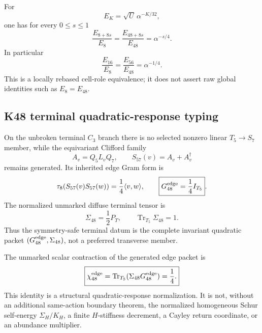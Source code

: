 \documentclass[12pt,a4paper]{article}
\begin{document}
\begin{corollary}
\label{p3c:cor:v190-normalized-energy-homology}
For
\[
 E_K=\sqrt U\,\alpha^{-K/32},
\]
one has for every $0\le s\le1$
\[
 \boxed{
 \frac{E_{8+8s}}{E_8}
 =\frac{E_{48+8s}}{E_{48}}
 =\alpha^{-s/4}.}
\]
In particular
\[
 \frac{E_{16}}{E_8}=\frac{E_{56}}{E_{48}}=\alpha^{-1/4}.
\]
This is a locally rebased cell-role equivalence; it does not assert raw global
identities such as $E_8=E_{48}$.
\end{corollary}

\subsection{K48 terminal quadratic-response typing}
\label{p3c:sec:v192-k48-quadratic-typing}

\begin{proposition}
\label{p3c:prop:v192-k48-complete-invariant-return}
On the unbroken terminal $C_3$ branch there is no selected nonzero linear
$T_5\to S_7$ member, while the equivariant Clifford family
\[
 A_v=Q_5L_vQ_7,
 \qquad
 S_{57}(v)=A_v+A_v^\dagger
\]
remains generated.  Its inherited edge Gram form is
\[
 \tau_8\!\left(S_{57}(v)S_{57}(w)\right)
 =\frac14\langle v,w\rangle,
 \qquad
 \boxed{G_{48}^{\rm edge}=\frac14 I_{T_5}}.
\]
The normalized unmarked diffuse terminal tensor is
\[
 \boxed{\Sigma_{48}=\frac12P_T,
 \qquad \operatorname{Tr}_{T_5}\Sigma_{48}=1.}
\]
Thus the symmetry-safe terminal datum is the complete invariant quadratic
packet $(G_{48}^{\rm edge},\Sigma_{48})$, not a preferred transverse member.
\end{proposition}

\begin{corollary}
\label{p3c:cor:v192-k48-quarter-typing}
The unmarked scalar contraction of the generated edge packet is
\[
 \boxed{\chi_{48}^{\rm edge}
 =\operatorname{Tr}_{T_5}
 (\Sigma_{48}G_{48}^{\rm edge})=\frac14.}
\]
This identity is a structural quadratic-response normalization.  It is not,
without an additional same-action boundary theorem, the normalized homogeneous
Schur self-energy $\Sigma_H/K_H$, a finite $H$-stiffness decrement, a Cayley
return coordinate, or an abundance multiplier.
\end{corollary}
\end{document}
